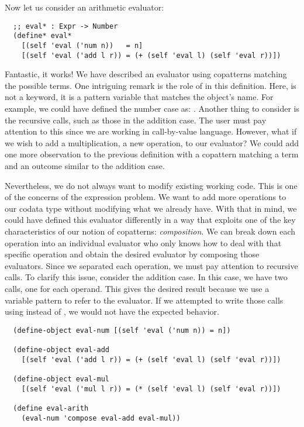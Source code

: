 Now let us consider an arithmetic evaluator:

\begin{verbatim}
  ;; eval* : Expr -> Number
  (define* eval*
    [(self 'eval ('num n))   = n]
    [(self 'eval ('add l r)) = (+ (self 'eval l) (self 'eval r))])
\end{verbatim}


Fantastic, it works! 
We have described an evaluator using copatterns matching the possible terms.
One intriguing remark is the role of  in this definition.
Here,   is not a keyword, it is a pattern variable that matches the object's name.
For example, we could have defined the number case as: \scm{[(eval* 'eval ('num n))   = n]}.
Another thing to consider is the recursive calls, such as those in the addition case.
The user must pay attention to this since we are working in call-by-value language.
However, what if we wish to add a multiplication, a new operation, to our evaluator? 
We could add one more observation to the previous definition with a copattern matching a  term and an outcome similar to the addition case.

Nevertheless, we do not always want to modify existing working code.
This is one of the concerns of the expression problem.
We want to add more operations to our codata type without modifying what we already have.
With that in mind, we could have defined this evaluator differently in a way that exploits one of the key characteristics of our notion of copatterns: \emph{composition}.
We can break down each operation into an individual evaluator who only knows how to deal with that specific operation and obtain the desired evaluator by composing those evaluators.
Since we separated each operation, we must pay attention to recursive calls. To clarify this issue, consider the addition case.
In this case, we have two  calls, one for each operand.
This gives the desired result because we use a variable pattern to refer to the evaluator.
If we attempted to write those calls using  instead of , we would not have the expected behavior.

\begin{verbatim}
  (define-object eval-num [(self 'eval ('num n)) = n])

  (define-object eval-add
    [(self 'eval ('add l r)) = (+ (self 'eval l) (self 'eval r))])
  
  (define-object eval-mul
    [(self 'eval ('mul l r)) = (* (self 'eval l) (self 'eval r))])
  
  (define eval-arith
    (eval-num 'compose eval-add eval-mul))  
\end{verbatim}


